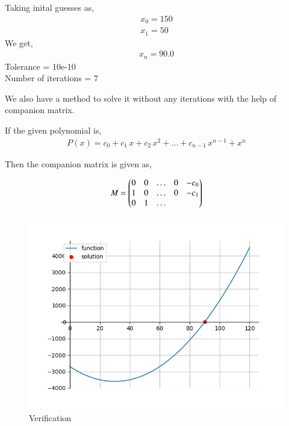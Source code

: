 \documentclass[journal]{IEEEtran}
\begin{document}
    Taking inital guesses as,
    \begin{align}
        x_0 = 150\\
        x_1 = 50
    \end{align}
    We get,
    \begin{align}
        x_n = 90.0
    \end{align}
    Tolerance = 10e-10\\
    Number of iterations = 7

We also have a method to solve it without any iterations with the help of companion matrix.

If the given polynomial is,
\begin{align}
	P(x) = c_0 + c_1\,x + c_2\,x^2 + \dots + c_{n-1}\,x^{n-1} + x^n
\end{align}

Then the companion matrix is given as,

\begin{align}
	M = \begin{pmatrix}0 & 0 & \dots & 0 & -c_0\\1 & 0 & \dots & 0 & -c_1\\0 & 1 & \dots & \end{pmatrix}
\end{align}
    \begin{figure}[ht]  
        \centering  
        \includegraphics[width=\columnwidth]{figs/fig1.png}  
        \caption{Verification}
    \end{figure}
\end{document}
